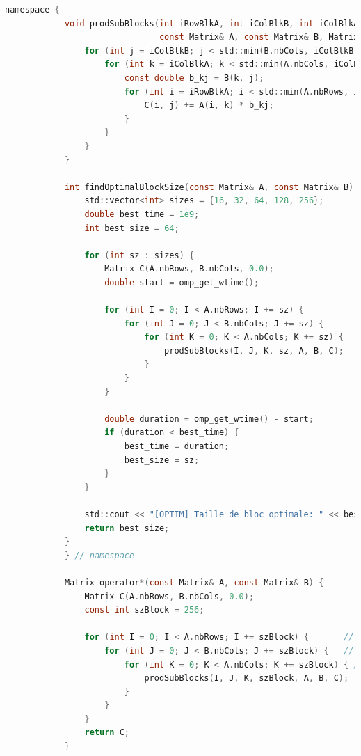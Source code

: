 \documentclass[a4paper,13pt]{book}
\begin{document}
	\begin{lstlisting}[language=C]
        namespace {
            void prodSubBlocks(int iRowBlkA, int iColBlkB, int iColBlkA, int szBlock,
                               const Matrix& A, const Matrix& B, Matrix& C) {
                for (int j = iColBlkB; j < std::min(B.nbCols, iColBlkB + szBlock); ++j) {
                    for (int k = iColBlkA; k < std::min(A.nbCols, iColBlkA + szBlock); ++k) {
                        const double b_kj = B(k, j); 
                        for (int i = iRowBlkA; i < std::min(A.nbRows, iRowBlkA + szBlock); ++i) {
                            C(i, j) += A(i, k) * b_kj;
                        }
                    }
                }
            }
            
            int findOptimalBlockSize(const Matrix& A, const Matrix& B) {
                std::vector<int> sizes = {16, 32, 64, 128, 256};
                double best_time = 1e9;
                int best_size = 64; 
            
                for (int sz : sizes) {
                    Matrix C(A.nbRows, B.nbCols, 0.0);
                    double start = omp_get_wtime();
                    
                    for (int I = 0; I < A.nbRows; I += sz) {
                        for (int J = 0; J < B.nbCols; J += sz) {
                            for (int K = 0; K < A.nbCols; K += sz) {
                                prodSubBlocks(I, J, K, sz, A, B, C);
                            }
                        }
                    }
                    
                    double duration = omp_get_wtime() - start;
                    if (duration < best_time) {
                        best_time = duration;
                        best_size = sz;
                    }
                }
                
                std::cout << "[OPTIM] Taille de bloc optimale: " << best_size << std::endl;
                return best_size;
            }
            } // namespace

            Matrix operator*(const Matrix& A, const Matrix& B) {
                Matrix C(A.nbRows, B.nbCols, 0.0);
                const int szBlock = 256;
            
                for (int I = 0; I < A.nbRows; I += szBlock) {       // Parcours lignes A
                    for (int J = 0; J < B.nbCols; J += szBlock) {   // Parcours colonnes B
                        for (int K = 0; K < A.nbCols; K += szBlock) { // Parcours commun
                            prodSubBlocks(I, J, K, szBlock, A, B, C);
                        }
                    }
                }
                return C;
            }
\end{lstlisting}
\end{document}
